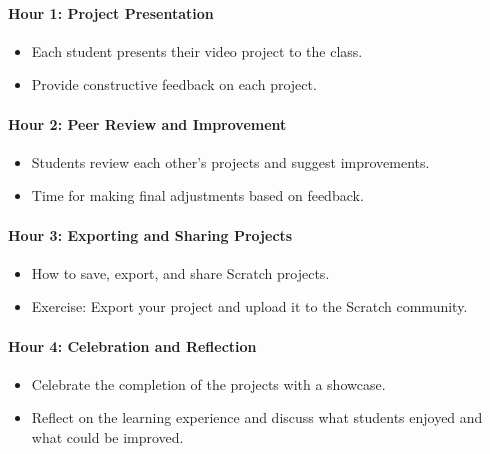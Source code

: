 \documentclass[main.tex]{subfiles}
\begin{document}
\paragraph{Hour 1: Project Presentation}
\begin{itemize}
  \item Each student presents their video project to the class.
  \item Provide constructive feedback on each project.
\end{itemize}

\paragraph{Hour 2: Peer Review and Improvement}
\begin{itemize}
  \item Students review each other’s projects and suggest improvements.
  \item Time for making final adjustments based on feedback.
\end{itemize}

\paragraph{Hour 3: Exporting and Sharing Projects}
\begin{itemize}
  \item How to save, export, and share Scratch projects.
  \item Exercise: Export your project and upload it to the Scratch community.
\end{itemize}

\paragraph{Hour 4: Celebration and Reflection}
\begin{itemize}
  \item Celebrate the completion of the projects with a showcase.
  \item Reflect on the learning experience and discuss what students enjoyed and what could be improved.
\end{itemize}
\end{document}
